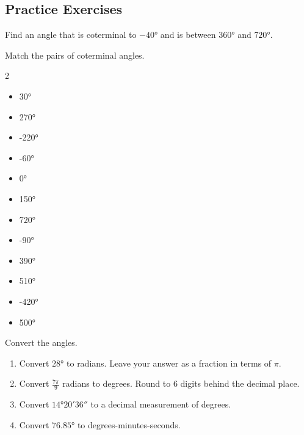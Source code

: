 \newpage

\subsection*{Practice Exercises} \label{practice-exercises-section-angles}

\begin{myPractice}
	Find an angle that is coterminal to $\ang{-40}$ and is between $\ang{360}$ and $\ang{720}$.
		\vfill
\end{myPractice}

\begin{myPractice}
	Match the pairs of coterminal angles.
			\begin{multicols}{2}
				\begin{itemize}
					\item \ang{30}
					\item \ang{270}
					\item \ang{-220}
					\item \ang{-60}
					\item \ang{0}
					\item \ang{150}
					\columnbreak
					\item \ang{720}
					\item \ang{-90}
					\item \ang{390}
					\item \ang{510}
					\item \ang{-420}
					\item \ang{500}
				\end{itemize}
			\end{multicols}
\end{myPractice}

\begin{myPractice}
	Convert the angles.
			\begin{enumerate}
				\item Convert $\ang{28}$ to radians. Leave your answer as a fraction in terms of $\pi$.
				\vfill
				\item Convert $\frac{7\pi}{9}$ radians to degrees. Round to 6 digits behind the decimal place.
				\vfill

\newpage

				\item Convert $\ang{14;20;36}$ to a decimal measurement of degrees. 
				\vfill
				\item Convert $\ang{76.85}$ to degrees-minutes-seconds.
				\vfill
			\end{enumerate}
\end{myPractice}

